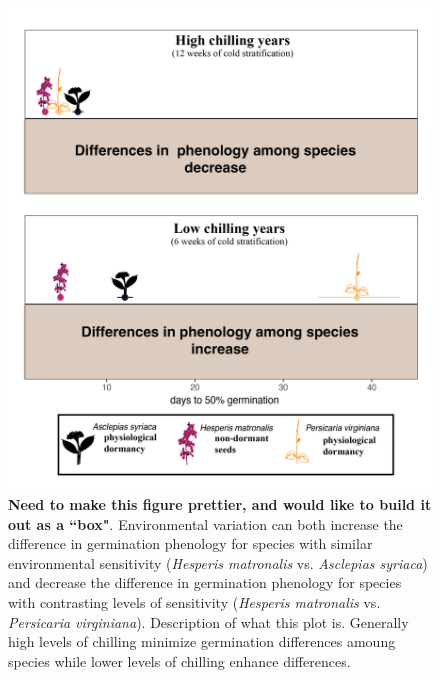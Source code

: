 \documentclass{article}[12pt]
\begin{document}
\begin{figure}[h!]
  \centering
 \includegraphics[width=\textwidth]{..//plots/prief_concept2-01.png}
    \caption{\textbf{Need to make this figure prettier, and would like to build it out as a ``box"}. Environmental variation can both increase the difference in germination phenology for species with similar environmental sensitivity (\emph{Hesperis matronalis} vs. \emph{Asclepias syriaca}) and decrease the difference in germination phenology for species with contrasting levels of sensitivity (\emph{Hesperis matronalis} vs. \emph{Persicaria virginiana}). Description of what this plot is. Generally high levels of chilling minimize germination differences amoung species while lower levels of chilling enhance differences.}
    \label{Fig:case}
\end{figure}
\end{document}
